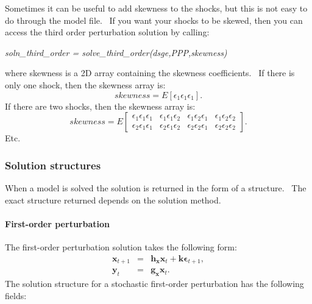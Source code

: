 \documentclass[notitlepage,11pt]{article}
\begin{document}
Sometimes it can be useful to add skewness to the shocks, but this is not
easy to do through the model file. \ If you want your shocks to be skewed,
then you can access the third order perturbation solution by calling:

\bigskip

\textit{soln\_third\_order = solve\_third\_order(dsge,PPP,skewness)}

\bigskip

where skewness is a 2D array containing the skewness coefficients. \ If
there is only one shock, then the skewness array is:%
\begin{equation*}
skewness=E\left[ \epsilon _{1}\epsilon _{1}\epsilon _{1}\right] .
\end{equation*}%
If there are two shocks, then the skewness array is:%
\begin{equation*}
skewness=E\left[ 
\begin{array}{cccc}
\epsilon _{1}\epsilon _{1}\epsilon _{1} & \epsilon _{1}\epsilon _{1}\epsilon
_{2} & \epsilon _{1}\epsilon _{2}\epsilon _{1} & \epsilon _{1}\epsilon
_{2}\epsilon _{2} \\ 
\epsilon _{2}\epsilon _{1}\epsilon _{1} & \epsilon _{2}\epsilon _{1}\epsilon
_{2} & \epsilon _{2}\epsilon _{2}\epsilon _{1} & \epsilon _{2}\epsilon
_{2}\epsilon _{2}%
\end{array}%
\right] .
\end{equation*}%
Etc.

\subsubsection{Solution structures}

When a model is solved the solution is returned in the form of a structure.
\ The exact structure returned depends on the solution method.

\paragraph{First-order perturbation}

The first-order perturbation solution takes the following form:%
\begin{eqnarray*}
\mathbf{x}_{t+1} &=&\mathbf{h}_{\mathbf{x}}\mathbf{x}_{t}+\mathbf{k\epsilon }%
_{t+1}, \\
\mathbf{y}_{t} &=&\mathbf{g}_{\mathbf{x}}\mathbf{x}_{t}.
\end{eqnarray*}%
The solution structure for a stochastic first-order perturbation has the
following fields:
\end{document}
